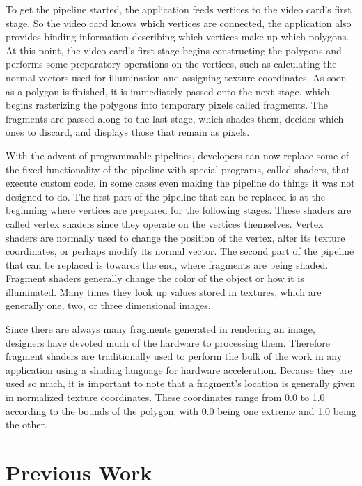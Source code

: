 \documentclass{report}
\begin{document}
To get the pipeline started, the application feeds vertices to the video card’s
first stage.  So the video card knows which vertices are connected, the
application also provides binding information describing which vertices make up
which polygons.  At this point, the video card’s first stage begins constructing
the polygons and performs some preparatory operations on the vertices, such as
calculating the normal vectors used for illumination and assigning texture
coordinates.  As soon as a polygon is finished, it is immediately passed onto
the next stage, which begins rasterizing the polygons into temporary pixels
called fragments.  The fragments are passed along to the last stage, which
shades them, decides which ones to discard, and displays those that remain as
pixels.

With the advent of programmable pipelines, developers can now replace some of
the fixed functionality of the pipeline with special programs, called shaders,
that execute custom code, in some cases even making the pipeline do things it
was not designed to do.  The first part of the pipeline that can be replaced is
at the beginning where vertices are prepared for the following stages.  These
shaders are called vertex shaders since they operate on the vertices themselves.
Vertex shaders are normally used to change the position of the vertex, alter its
texture coordinates, or perhaps modify its normal vector.  The second part of
the pipeline that can be replaced is towards the end, where fragments are being
shaded.  Fragment shaders generally change the color of the object or how it is
illuminated.  Many times they look up values stored in textures, which are
generally one, two, or three dimensional images.

Since there are always many fragments generated in rendering an image, designers
have devoted much of the hardware to processing them.  Therefore fragment
shaders are traditionally used to perform the bulk of the work in any
application using a shading language for hardware acceleration.  Because they
are used so much, it is important to note that a fragment’s location is
generally given in normalized texture coordinates.  These coordinates range from
0.0 to 1.0 according to the bounds of the polygon, with 0.0 being one extreme
and 1.0 being the other.

\chapter{Previous Work}
\end{document}
